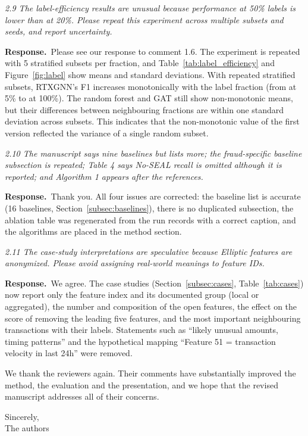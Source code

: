 \documentclass[11pt]{article}
\newenvironment{comment}{\par\medskip\noindent\begin{minipage}{\linewidth}\itshape\color{black!75}}{\end{minipage}\par\smallskip}
\newcommand{\resp}{\par\noindent\textbf{Response.}\ }
\begin{document}
\begin{comment}
2.9 The label-efficiency results are unusual because performance at 50\% labels is lower than at 20\%. Please repeat this experiment across multiple subsets and seeds, and report uncertainty.
\end{comment}
\resp Please see our response to comment 1.6. The experiment is repeated with 5 stratified subsets per fraction, and Table~\ref{tab:label_efficiency} and Figure~\ref{fig:label} show means and standard deviations. With repeated stratified subsets, RTXGNN's F1 increases monotonically with the label fraction (from \lertxgnnFive{} at 5\% to \lertxgnnOneZeroZero{} at 100\%). The random forest and GAT still show non-monotonic means, but their differences between neighbouring fractions are within one standard deviation across subsets. This indicates that the non-monotonic value of the first version reflected the variance of a single random subset.

\begin{comment}
2.10 The manuscript says nine baselines but lists more; the fraud-specific baseline subsection is repeated; Table 4 says No-SEAL recall is omitted although it is reported; and Algorithm 1 appears after the references.
\end{comment}
\resp Thank you. All four issues are corrected: the baseline list is accurate (16 baselines, Section~\ref{subsec:baselines}), there is no duplicated subsection, the ablation table was regenerated from the run records with a correct caption, and the algorithms are placed in the method section.

\begin{comment}
2.11 The case-study interpretations are speculative because Elliptic features are anonymized. Please avoid assigning real-world meanings to feature IDs.
\end{comment}
\resp We agree. The case studies (Section~\ref{subsec:cases}, Table~\ref{tab:cases}) now report only the feature index and its documented group (local or aggregated), the number and composition of the open features, the effect on the score of removing the leading five features, and the most important neighbouring transactions with their labels. Statements such as ``likely unusual amounts, timing patterns'' and the hypothetical mapping ``Feature 51 = transaction velocity in last 24h'' were removed.

\bigskip
We thank the reviewers again. Their comments have substantially improved the method, the evaluation and the presentation, and we hope that the revised manuscript addresses all of their concerns.

\medskip
Sincerely,\\
The authors
\end{document}
